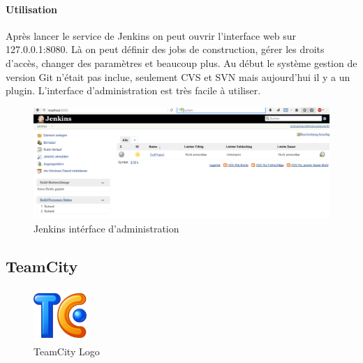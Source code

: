 \paragraph{Utilisation} Après lancer le service de Jenkins on peut ouvrir l'interface web sur 127.0.0.1:8080. Là on peut définir des jobs de construction, gérer les droits d'accès, changer des paramètres et beaucoup plus. Au début le système gestion de version Git n'était pas inclue, seulement CVS et SVN mais aujourd'hui il y a un plugin. L'interface d'administration est très facile à utiliser.
\begin{figure}[H]
	\centering
		\includegraphics[width=15cm]{bilder/JenkinsGui}
	\caption{Jenkins intérface d'administration}
	\label{fig:jenkinsgui}
\end{figure}













\clearpage
\subsection{TeamCity}
\begin{figure}
  \begin{center}
    \includegraphics[width=0.18\textwidth]{bilder/teamcity512}
  \end{center}
  \caption{TeamCity Logo}
\end{figure}
